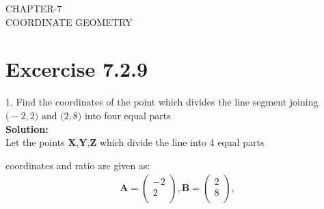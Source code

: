 \documentclass[12pt]{article}
\newcommand{\solution}{\noindent \textbf{Solution: }}
\newcommand{\myvec}[1]{\ensuremath{\begin{pmatrix}#1\end{pmatrix}}}
\let\vec\mathbf
\begin{document}
\begin{center}
\textbf\large{CHAPTER-7 \\ COORDINATE GEOMETRY}
\end{center}
\section*{Excercise 7.2.9}

1. Find the coordinates of the point which divides the line segment joining $\vec(-2,2) \text{ and } \vec(2,8)$ into four equal parts
\\
\solution\\		
Let the points $\vec{X}$,$\vec{Y}$,$\vec{Z}$ which divide the line into 4 equal parts\\

\begin{table}[ht!]\centering

\end{table}

coordinates and ratio are given as:
\begin{align}
\vec{A}=\myvec{-2\\2\\},
\vec{B}=\myvec{2\\8\\},
\end{align}
\end{document}
